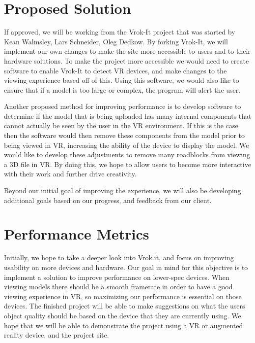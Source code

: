 \documentclass[letterpaper,10pt,draftclsnofoot,onecolumn, titlepage]{IEEEtran}
\begin{document}
\section{Proposed Solution}
{If approved, we will be working from the Vrok-It project that was started by Kean Walmsley, Lars Schneider, Oleg Dedkow. By forking Vrok-It, we will implement our own changes to make the site more accessible to users and to their hardware solutions. To make the project more accessible we would need to create software to enable Vrok-It to detect VR devices, and make changes to the viewing experience based off of this. Using this software, we would also like to ensure that if a model is too large or complex, the program will alert the user.

Another proposed method for improving performance is to develop software to determine if the model that is being uploaded has many internal components that cannot actually be seen by the user in the VR environment. If this is the case then the software would then remove these components from the model prior to being viewed in VR, increasing the ability of the device to display the model. We would like to develop these adjustments to remove many roadblocks from viewing a 3D file in VR. By doing this, we hope to allow users to become more interactive with their work and further drive creativity.

Beyond our initial goal of improving the experience, we will also be developing additional goals based on our progress, and feedback from our client. 

\par}

\section{Performance Metrics}
{Initially, we hope to take a deeper look into Vrok.it, and focus on improving usability on more devices and hardware. Our goal in mind for this objective is to implement a solution to improve performance on lower-spec devices. When viewing models there should be a smooth framerate in order to have a good viewing experience in VR, so maximizing our performance is essential on those devices. The finished project will be able to make suggestions on what the users object quality should be based on the device that they are currently using. We hope that we will be able to demonstrate the project using a VR or augmented reality device, and the project site. \par}
\end{document}
